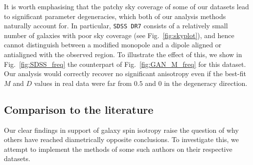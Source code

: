 \documentclass[fleqn,usenatbib,nofootinbib]{mnras}
\begin{document}
It is worth emphasising that the patchy sky coverage of some of our datasets lead to significant parameter degeneracies, which both of our analysis methods naturally account for. In particular, \texttt{SDSS DR7} consists of a relatively small number of galaxies with poor sky coverage (see Fig.~\ref{fig:skyplot}), and hence cannot distinguish between a modified monopole and a dipole aligned or antialigned with the observed region. To illustrate the effect of this, we show in Fig.~\ref{fig:SDSS_freq} the counterpart of Fig.~\ref{fig:GAN_M_freq} for this dataset. Our analysis would correctly recover no significant anisotropy even if the best-fit $M$ and $D$ values in real data were far from $0.5$ and $0$ in the degeneracy direction.

\subsection{Comparison to the literature}
\label{sec:res_lit_comp}

Our clear findings in support of galaxy spin isotropy raise the question of why others have reached diametrically opposite conclusions. To investigate this, we attempt to implement the methods of some such authors on their respective datasets.
\end{document}
